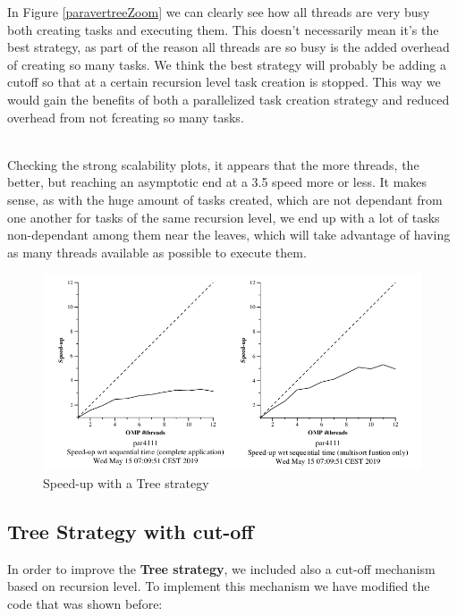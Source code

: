 \documentclass[12]{article}
\begin{document}
In Figure \ref{paravertreeZoom} we can clearly see how all threads are very busy both creating tasks and executing them. This doesn't necessarily mean it's the best strategy, as part of the reason all threads are so busy is the added overhead of creating so many tasks. We think the best strategy will probably be adding a cutoff so that at a certain recursion level task creation is stopped. This way we would gain the benefits of both a parallelized task creation strategy and reduced overhead from not fcreating so many tasks.

\\
Checking the strong scalability plots, it appears that the more threads, the better, but reaching an asymptotic end at a 3.5 speed more or less. It makes sense, as with the huge amount of tasks created, which are not dependant from one another for tasks of the same recursion level, we end up with a lot of tasks non-dependant among them near the leaves, which will take advantage of having as many threads available as possible to execute them.
\medskip
\begin{figure}[H]
    \centering
    \includegraphics[scale=0.75]{images/treeStrong.png}
    \caption{Speed-up with a Tree strategy}
    \label{speeduptree}
\end{figure}

\subsection{Tree Strategy with cut-off}
\medskip

In order to improve the \textbf{Tree strategy}, we included also a cut-off mechanism based on recursion level. To implement this mechanism we have modified the code that was shown before:
\medskip
\end{document}
